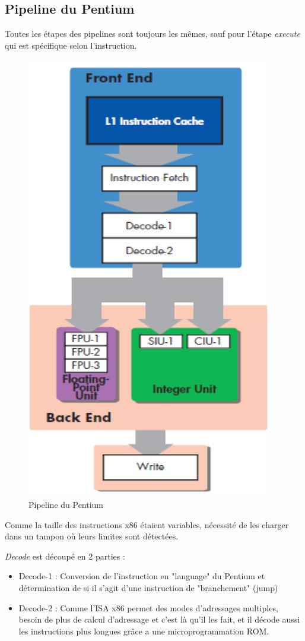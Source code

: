 \documentclass[a4paper]{article}
\begin{document}
    \subsection{Pipeline du Pentium}
    Toutes les étapes des pipelines sont toujours les mêmes, sauf pour l'étape \emph{execute} qui est spécifique selon l'instruction.
    \begin{figure}[H]
      \centering
      \includegraphics[width = 0.3 \textwidth]{images/10.PNG}
      \caption{Pipeline du Pentium}
    \end{figure}

    Comme la taille des instructions x86 étaient variables, nécessité de les charger dans un tampon où leurs limites sont détectées.

    \emph{Decode} est découpé en 2 parties :
    \begin{itemize}
      \item Decode-1 : Conversion de l'instruction en "language" du Pentium et détermination de si il s'agit d'une instruction de "branchement" (jump)
      \item Decode-2 : Comme l'ISA x86 permet des modes d'adressages multiples, besoin de plus de calcul d'adressage et c'est là qu'il les fait, et il décode aussi 
      les instructions plus longues grâce a une microprogrammation ROM.
    \end{itemize}
\end{document}

